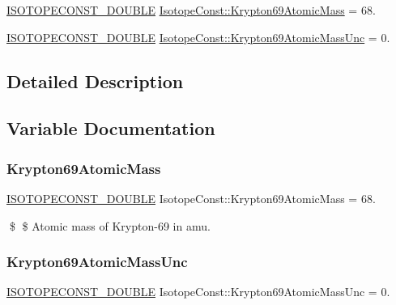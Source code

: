 \begin{DoxyCompactItemize}
\item 
\mbox{\hyperlink{group___isotope_const-_macros_ga8f45a7272ce02c0b4c65c44636ed719a}{I\+S\+O\+T\+O\+P\+E\+C\+O\+N\+S\+T\+\_\+\+D\+O\+U\+B\+LE}} \mbox{\hyperlink{group___isotope_const-_krypton-_kr69_ga2ccb18afd6a1e6fc9fc4575845a944a8}{Isotope\+Const\+::\+Krypton69\+Atomic\+Mass}} = 68.
\item 
\mbox{\hyperlink{group___isotope_const-_macros_ga8f45a7272ce02c0b4c65c44636ed719a}{I\+S\+O\+T\+O\+P\+E\+C\+O\+N\+S\+T\+\_\+\+D\+O\+U\+B\+LE}} \mbox{\hyperlink{group___isotope_const-_krypton-_kr69_gabd2d172cb4c75166d22e62bd99b9a17f}{Isotope\+Const\+::\+Krypton69\+Atomic\+Mass\+Unc}} = 0.
\end{DoxyCompactItemize}


\subsection{Detailed Description}


\subsection{Variable Documentation}
\mbox{\label{group___isotope_const-_krypton-_kr69_ga2ccb18afd6a1e6fc9fc4575845a944a8}} 
\subsubsection{\texorpdfstring{Krypton69\+Atomic\+Mass}{Krypton69AtomicMass}}
{\footnotesize\ttfamily \mbox{\hyperlink{group___isotope_const-_macros_ga8f45a7272ce02c0b4c65c44636ed719a}{I\+S\+O\+T\+O\+P\+E\+C\+O\+N\+S\+T\+\_\+\+D\+O\+U\+B\+LE}} Isotope\+Const\+::\+Krypton69\+Atomic\+Mass = 68.}

\$ \$ Atomic mass of Krypton-\/69 in amu. \mbox{\label{group___isotope_const-_krypton-_kr69_gabd2d172cb4c75166d22e62bd99b9a17f}} 
\subsubsection{\texorpdfstring{Krypton69\+Atomic\+Mass\+Unc}{Krypton69AtomicMassUnc}}
{\footnotesize\ttfamily \mbox{\hyperlink{group___isotope_const-_macros_ga8f45a7272ce02c0b4c65c44636ed719a}{I\+S\+O\+T\+O\+P\+E\+C\+O\+N\+S\+T\+\_\+\+D\+O\+U\+B\+LE}} Isotope\+Const\+::\+Krypton69\+Atomic\+Mass\+Unc = 0.}

